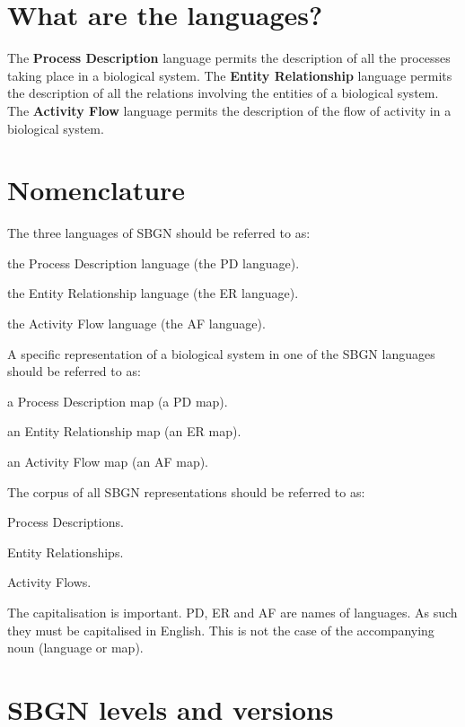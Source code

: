 \section{What are the languages?}
\label{sec:what-languages}

The \textbf{Process Description} language permits the description of all the processes taking place in a biological system. 
The \textbf{Entity Relationship} language permits the description of all the relations involving the entities of a biological system.
The \textbf{Activity Flow} language permits the description of the flow of activity in a biological system.

\section{Nomenclature}
\label{sec:nomenclature}

The three languages of SBGN should be referred to as:
\begin{compactitem}
\item the Process Description language (the PD language).
\item the Entity Relationship language (the ER language).
\item the Activity Flow language  (the AF language).
\end{compactitem}
A specific representation of a biological system in one of the SBGN languages should be referred to as:
\begin{compactitem}
\item a Process Description map (a PD map).
\item an Entity Relationship map (an ER map).
\item an Activity Flow map (an AF map).
\end{compactitem}
The corpus of all SBGN representations should be referred to as:
\begin{compactitem}
\item Process Descriptions.
\item Entity Relationships.
\item Activity Flows.
\end{compactitem}
The capitalisation is important. PD, ER and AF are names of languages. 
As such they must be capitalised in English. This is not the case of the accompanying noun (language or map).



\section{SBGN levels and versions}
\label{sec:sbgn-levels}

